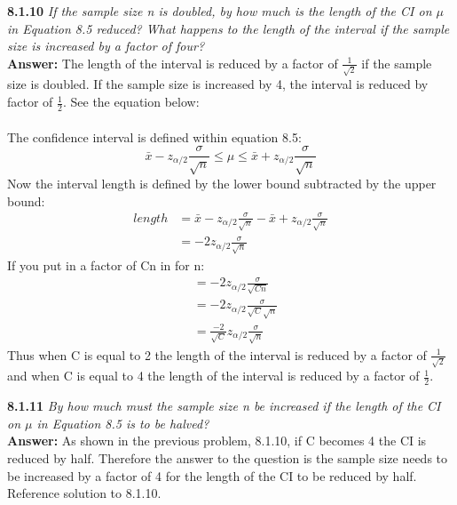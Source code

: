 \documentclass[11pt]{article}
\begin{document}
\begin{enumerate}
\end{enumerate}
\noindent \textbf{8.1.10} \emph{ If the sample size n is doubled, by how much is the length of the CI on $\mu$ in Equation 8.5 reduced? What happens to the length of the interval if the sample size is increased by a factor of four?}
\\\textbf{Answer:} The length of the interval is reduced by a factor of $\frac{1}{\sqrt{2}}$ if the sample size is doubled. If the sample size is increased by 4, the interval is reduced by factor of $\frac{1}{2}$. See the equation below:\\\\
The confidence interval is defined within equation 8.5:
\begin{equation}
\bar{x} - z_{\alpha/2}\frac{\sigma}{\sqrt{n}} \leq \mu \leq \bar{x} + z_{\alpha/2}\frac{\sigma}{\sqrt{n}}
\end{equation}
Now the interval length is defined by the lower bound subtracted by the upper bound:
\begin{equation}
\begin{split}
length &= \bar{x} - z_{\alpha/2}\frac{\sigma}{\sqrt{n}} - \bar{x} + z_{\alpha/2}\frac{\sigma}{\sqrt{n}} \\
&= -2z_{\alpha/2}\frac{\sigma}{\sqrt{n}}
\end{split}
\end{equation}
If you put in a factor of Cn in for n:
\begin{equation}
\begin{split}
&= -2z_{\alpha/2}\frac{\sigma}{\sqrt{Cn}} \\
 &= -2z_{\alpha/2}\frac{\sigma}{\sqrt{C}\sqrt{n}} \\
&= \frac{-2}{\sqrt{C}}z_{\alpha/2}\frac{\sigma}{\sqrt{n}}
\end{split}
\end{equation}
Thus when C is equal to 2 the length of the interval is reduced by a factor of $\frac{1}{\sqrt{2}}$ and when C is equal to 4 the length of the interval is reduced by a factor of $\frac{1}{2}$.




\noindent \textbf{8.1.11} \emph{ By how much must the sample size n be increased if the length of the CI on $\mu$ in Equation 8.5 is to be halved?}
\\\textbf{Answer:} As shown in the previous problem, 8.1.10, if C becomes 4 the CI is reduced by half. Therefore the answer to the question is the sample size needs to be increased by a factor of 4 for the length of the CI to be reduced by half. Reference solution to 8.1.10.
\end{document}
